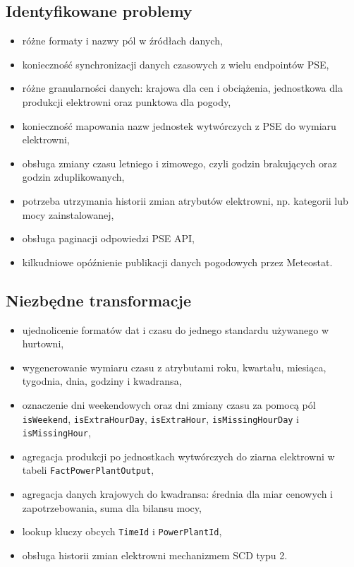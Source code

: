 \documentclass[12pt]{article}
\begin{document}
	\subsection{Identyfikowane problemy}
	\begin{itemize}
		\item różne formaty i nazwy pól w źródłach danych,
		\item konieczność synchronizacji danych czasowych z wielu endpointów PSE,
		\item różne granularności danych: krajowa dla cen i obciążenia, jednostkowa dla produkcji elektrowni oraz punktowa dla pogody,
		\item konieczność mapowania nazw jednostek wytwórczych z PSE do wymiaru elektrowni,
		\item obsługa zmiany czasu letniego i zimowego, czyli godzin brakujących oraz godzin zduplikowanych,
		\item potrzeba utrzymania historii zmian atrybutów elektrowni, np. kategorii lub mocy zainstalowanej,
		\item obsługa paginacji odpowiedzi PSE API,
		\item kilkudniowe opóźnienie publikacji danych pogodowych przez Meteostat.
	\end{itemize}

	\subsection{Niezbędne transformacje}
	\begin{itemize}
		\item ujednolicenie formatów dat i czasu do jednego standardu używanego w hurtowni,
		\item wygenerowanie wymiaru czasu z atrybutami roku, kwartału, miesiąca, tygodnia, dnia, godziny i kwadransa,
		\item oznaczenie dni weekendowych oraz dni zmiany czasu za pomocą pól \texttt{isWeekend}, \texttt{isExtraHourDay}, \texttt{isExtraHour}, \texttt{isMissingHourDay} i \texttt{isMissingHour},
		\item agregacja produkcji po jednostkach wytwórczych do ziarna elektrowni w tabeli \texttt{FactPowerPlantOutput},
		\item agregacja danych krajowych do kwadransa: średnia dla miar cenowych i zapotrzebowania, suma dla bilansu mocy,
		\item lookup kluczy obcych \texttt{TimeId} i \texttt{PowerPlantId},
		\item obsługa historii zmian elektrowni mechanizmem SCD typu 2.
	\end{itemize}
\end{document}
